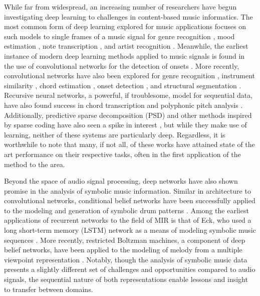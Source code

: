 While far from widespread, an increasing number of researchers have begun investigating deep learning to challenges in content-based music informatics.
The most common form of deep learning explored for music applications focuses on such models to single frames of a music signal for genre recognition \cite{Hamel2009Automatic}, mood estimation \cite{Schmidt2011Modeling}, note transcription \cite{Nam2011Classification}, and artist recognition \cite{Dieleman2011Audio}.
Meanwhile, the earliest instance of modern deep learning methods applied to music signals is found in the use of convolutional networks for the detection of onsets \cite{Lacoste2007Supervised}.
More recently, convolutional networks have also been explored for genre recognition \cite{Li2010Automatic}, instrument similarity \cite{Humphrey2011Nonlinear}, chord estimation \cite{Humphrey2012Learning, Humphrey2012Rethinking}, onset detection \cite{Schluter2014Improved}, and structural segmentation \cite{Ullrich2014Boundary}.
Recursive neural networks, a powerful, if troublesome, model for sequential data, have also found success in chord transcription \cite{Boulanger2013Audio} and polyphonic pitch analysis \cite{Sigtia2014RNN}.
Additionally, predictive sparse decomposition (PSD) and other methods inspired by sparse coding have also seen a spike in interest \cite{Henaff2011Unsupervised, Nam2012Learning}, but while they make use of learning, neither of these systems are particularly deep.
Regardless, it is worthwhile to note that many, if not all, of these works have attained state of the art performance on their respective tasks, often in the first application of the method to the area.

Beyond the space of audio signal processing, deep networks have also shown promise in the analysis of symbolic music information.
Similar in architecture to convolutional networks, conditional belief networks have been successfully applied to the modeling and generation of symbolic drum patterns \cite{Battenberg2012Analyzing}.
Among the earliest applications of recurrent networks to the field of MIR is that of Eck, who used a long short-term memory (LSTM) network as a means of  modeling symbolic music sequences \cite{Eck2008Learning}.
More recently, restricted Boltzman machines, a component of deep belief networks, have been applied to the modeling of melody from a multiple viewpoint representation \cite{Cherla2014Multiple}.
Notably, though the analysis of symbolic music data presents a slightly different set of challenges and opportunities compared to audio signals, the sequential nature of both representations enable lessons and insight to transfer between domains.

